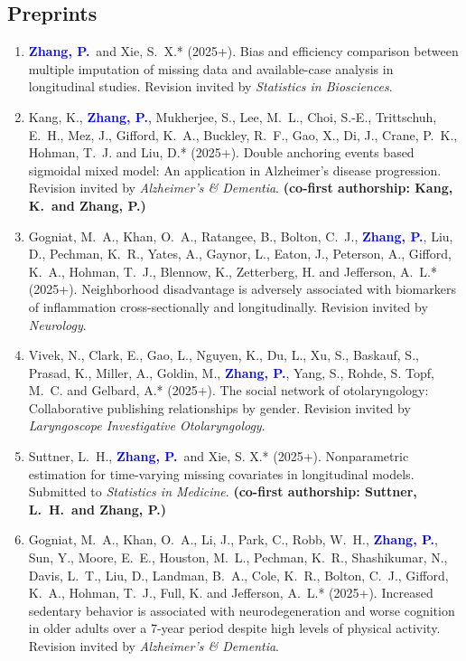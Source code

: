 \documentclass[12pt]{article}
\newcommand{\PZnot}{\textcolor{blue}{\textbf{Zhang, P.}}}
\begin{document}
	\subsection*{Preprints}
	\begin{enumerate}						 
	 	\item \PZnot\ and {\sc Xie, S.\ X.*} (2025+). Bias 
	 	and efficiency comparison between multiple imputation of 
	 	missing data and available-case analysis in longitudinal 
	 	studies. Revision invited by {\em Statistics in Biosciences}.
		
		\item {\sc Kang, K.}, \PZnot, {\sc Mukherjee, S., Lee, M.\ 
		L., Choi, S.-E., Trittschuh, E.\ H., Mez, J., Gifford, K.\ 
		A., Buckley, R.\ F., Gao, X., Di, J., Crane, P.\ K., Hohman, 
		T.\ J.} and {\sc Liu, D.*} (2025+). Double anchoring events 
		based sigmoidal mixed model: An application in Alzheimer's 
		disease progression. Revision invited by {\em Alzheimer's \& 
		Dementia}. {\bf (co-first authorship: Kang, K.\ and Zhang, 
		P.)}
		
		\item {\sc Gogniat, M.\ A., Khan, O.\ A., Ratangee, B., 
		Bolton, C.\ J.,} \PZnot, {\sc Liu, D., Pechman, K.\ R., 
		Yates, A., Gaynor, L., Eaton, J., Peterson, A., Gifford, K.\ 
		A., Hohman, T.\ J., Blennow, K., Zetterberg, H.} and {\sc 
		Jefferson, A.\ L.*} (2025+). Neighborhood disadvantage is 
		adversely associated with biomarkers of inflammation 
		cross-sectionally and longitudinally. Revision invited by 
		{\em Neurology}.
		
		\item {\sc Vivek, N., Clark, E., Gao, L., Nguyen, K., Du, 
		L., Xu, S., Baskauf, S., Prasad, K., Miller, A., Goldin, 
		M.,} \PZnot, {\sc Yang, S., Rohde, S. Topf, M.\ C.} and {\sc 
		Gelbard, A.*} (2025+). The social network of otolaryngology: 
		Collaborative publishing relationships by gender. Revision 
		invited by {\em Laryngoscope Investigative Otolaryngology}.
					
		\item {\sc Suttner, L.\ H.,} \PZnot\ and {\sc Xie, S. X.*} 
		(2025+). Nonparametric estimation for time-varying missing 
		covariates in longitudinal models. Submitted to {\em 
		Statistics in Medicine}. {\bf (co-first authorship: Suttner, 
		L.\ H.\ and Zhang, P.)}
				
		
		\item {\sc Gogniat, M.\ A., Khan, O.\ A., Li, J., Park, C., 
		Robb, W.\ H.,} \PZnot, {\sc Sun, Y., Moore, E.\ E., Houston, 
		M.\ L., Pechman, K.\ R., Shashikumar, N., Davis, L.\ T., 
		Liu, D., Landman, B.\ A., Cole, K.\ R., Bolton, C.\ J., 
		Gifford, K.\ A., Hohman, T.\ J., Full, K.} and {\sc 
		Jefferson, A.\ 
		L.*} (2025+). Increased sedentary behavior is associated 
		with neurodegeneration and worse cognition in older adults 
		over a 7-year period despite high levels of physical 
		activity. Revision invited by 
		{\em Alzheimer's \& Dementia}.
		

\end{enumerate}
\end{document}
